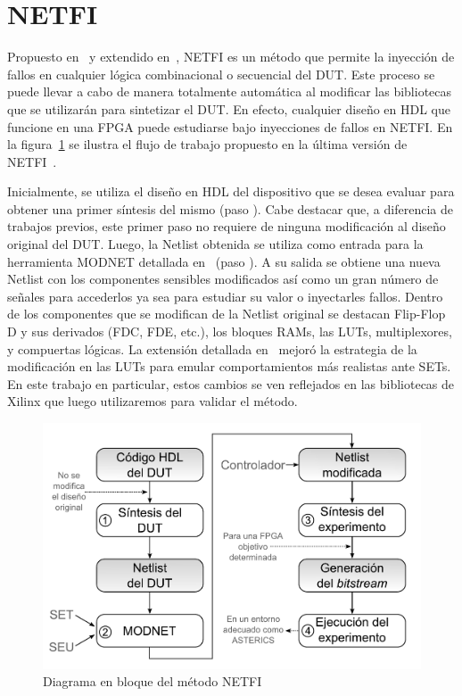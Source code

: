 \documentclass[a4paper,openright,12pt]{report}
\newcommand*\circled[1]{\tikz[baseline=(char.base)]{
            \node[shape=circle,draw,inner sep=0.7pt] (char) {#1};}}
\begin{document}
\section{NETFI}

Propuesto en~\cite{Mansour2013-1} y extendido en~\cite{Mansour2013-2}, NETFI es un método que permite la inyección de fallos en cualquier lógica combinacional o secuencial del DUT. Este proceso se puede llevar a cabo de manera totalmente automática al modificar las bibliotecas que se utilizarán para sintetizar el DUT. En efecto, cualquier diseño en HDL que funcione en una FPGA puede estudiarse bajo inyecciones de fallos en NETFI. En la figura~\ref{netfi_flow} se ilustra el flujo de trabajo propuesto en la última versión de NETFI~\cite{Mansour2013-2}.

Inicialmente, se utiliza el diseño en HDL del dispositivo que se desea evaluar para obtener una primer síntesis del mismo (paso \circled{1}). Cabe destacar que, a diferencia de trabajos previos, este primer paso no requiere de ninguna modificación al diseño original del DUT. Luego, la Netlist obtenida se utiliza como entrada para la herramienta MODNET detallada en~\cite{Mansour2013-1} (paso \circled{2}). A su salida se obtiene una nueva Netlist con los componentes sensibles modificados así como un gran número de señales para accederlos ya sea para estudiar su valor o inyectarles fallos. Dentro de los componentes que se modifican de la Netlist original se destacan Flip-Flop D  y sus derivados (FDC, FDE, etc.), los bloques RAMs, las LUTs, multiplexores, y compuertas lógicas. La extensión detallada en~\cite{Mansour2013-2} mejoró la estrategia de la modificación en las LUTs para emular comportamientos más realistas ante SETs. En este trabajo en particular, estos cambios se ven reflejados en las bibliotecas de Xilinx que luego utilizaremos para validar el método.

\begin{figure}[H]
	\centering
	\includegraphics[width=0.47 \textwidth]{img/netfi_flow.pdf}
	\caption{Diagrama en bloque del método NETFI}
	\label{netfi_flow}
\end{figure}
\end{document}
